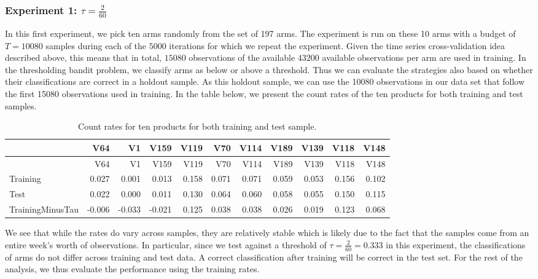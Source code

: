 \documentclass[12pt,]{article}
\begin{document}
\subsubsection{\texorpdfstring{Experiment 1:
\(\tau = \frac{2}{60}\)}{Experiment 1: \textbackslash{}tau = \textbackslash{}frac\{2\}\{60\}}}\label{experiment-1-tau-frac260}

In this first experiment, we pick ten arms randomly from the set of 197
arms. The experiment is run on these 10 arms with a budget of
\(T=10080\) samples during each of the \(5000\) iterations for which we
repeat the experiment. Given the time series cross-validation idea
described above, this means that in total, \(15080\) observations of the
available \(43200\) available observations per arm are used in training.
In the thresholding bandit problem, we classify arms as below or above a
threshold. Thus we can evaluate the strategies also based on whether
their classifications are correct in a holdout sample. As this holdout
sample, we can use the 10080 observations in our data set that follow
the first 15080 observations used in training. In the table below, we
present the count rates of the ten products for both training and test
samples.

\begin{longtable}[]{@{}lrrrrrrrrrr@{}}
\caption{Count rates for ten products for both training and test
sample.}\tabularnewline
\toprule
& V64 & V1 & V159 & V119 & V70 & V114 & V189 & V139 & V118 &
V148\tabularnewline
\midrule
\endfirsthead
\toprule
& V64 & V1 & V159 & V119 & V70 & V114 & V189 & V139 & V118 &
V148\tabularnewline
\midrule
\endhead
Training & 0.027 & 0.001 & 0.013 & 0.158 & 0.071 & 0.071 & 0.059 & 0.053
& 0.156 & 0.102\tabularnewline
Test & 0.022 & 0.000 & 0.011 & 0.130 & 0.064 & 0.060 & 0.058 & 0.055 &
0.150 & 0.115\tabularnewline
TrainingMinusTau & -0.006 & -0.033 & -0.021 & 0.125 & 0.038 & 0.038 &
0.026 & 0.019 & 0.123 & 0.068\tabularnewline
\bottomrule
\end{longtable}

We see that while the rates do vary across samples, they are relatively
stable which is likely due to the fact that the samples come from an
entire week's worth of observations. In particular, since we test
against a threshold of \(\tau = \frac{2}{60} = 0.333\) in this
experiment, the classifications of arms do not differ across training
and test data. A correct classification after training will be correct
in the test set. For the rest of the analysis, we thus evaluate the
performance using the training rates.
\end{document}
